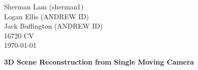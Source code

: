 \documentclass[11pt]{article}
\begin{document}
\begin{flushleft}
Sherman Lam (sherman1) \\
Logan Ellis (ANDREW ID) \\
Jack Buffington (ANDREW ID)  \\
16720 CV\\
\today
\end{flushleft}



\begin{center}
\begin{Large}
\textbf{3D Scene Reconstruction from Single Moving Camera}
\end{Large}
\end{center}








\clearpage


\end{document}
